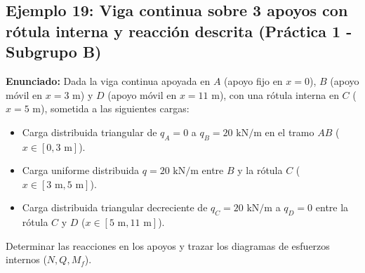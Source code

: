 \subsection{Ejemplo 19: Viga continua sobre 3 apoyos con rótula interna y reacción descrita (Práctica 1 - Subgrupo B)}

\textbf{Enunciado:}
Dada la viga continua apoyada en $A$ (apoyo fijo en $x = 0$), $B$ (apoyo móvil en $x = 3\text{ m}$) y $D$ (apoyo móvil en $x = 11\text{ m}$), con una rótula interna en $C$ ($x = 5\text{ m}$), sometida a las siguientes cargas:
\begin{itemize}
    \item Carga distribuida triangular de $q_A = 0$ a $q_B = 20\text{ kN/m}$ en el tramo $AB$ ($x \in [0, 3\text{ m}]$).
    \item Carga uniforme distribuida $q = 20\text{ kN/m}$ entre $B$ y la rótula $C$ ($x \in [3\text{ m}, 5\text{ m}]$).
    \item Carga distribuida triangular decreciente de $q_C = 20\text{ kN/m}$ a $q_D = 0$ entre la rótula $C$ y $D$ ($x \in [5\text{ m}, 11\text{ m}]$).
\end{itemize}

Determinar las reacciones en los apoyos y trazar los diagramas de esfuerzos internos ($N, Q, M_f$).

